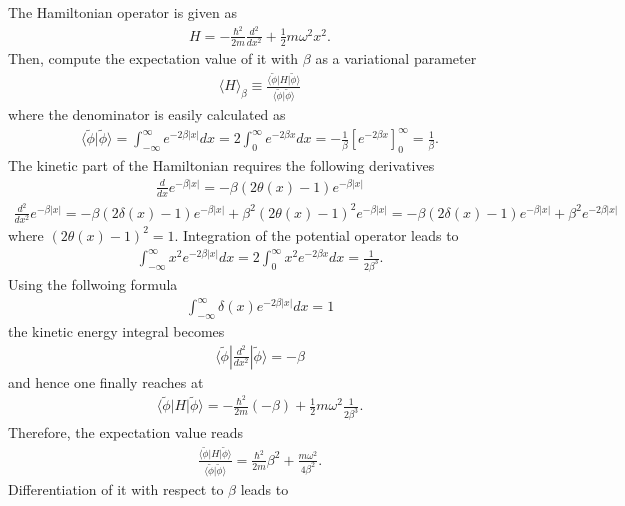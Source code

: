 \documentclass{jlreq}
\begin{document}
The Hamiltonian operator is given as
\begin{align}
    H=-\frac{\hbar^2}{2m}\frac{d^2}{dx^2}+\frac{1}{2}m\omega^2x^2.
\end{align}
Then, compute the expectation value of it with $\beta$ as a variational parameter
\begin{align}
    \langle H\rangle_\beta\equiv\frac{\langle\tilde{\phi}|H|\tilde{\phi}\rangle}{\langle\tilde{\phi}|\tilde{\phi}\rangle}
\end{align}
where the denominator is easily calculated as
\begin{align}
    \langle\tilde{\phi}|\tilde{\phi}\rangle=\int^\infty_{-\infty}e^{-2\beta|x|} dx=2\int^\infty_{0}e^{-2\beta x} dx = -\frac{1}{\beta}[e^{-2\beta x}]^\infty_0=\frac{1}{\beta}.
\end{align}
The kinetic part of the Hamiltonian requires the following derivatives
\begin{align}
    \frac{d}{dx}e^{-\beta |x|}=-\beta (2\theta(x)-1)e^{-\beta |x|}
\end{align}
\begin{align}
    \frac{d^2}{dx^2}e^{-\beta |x|}=-\beta (2\delta(x)-1)e^{-\beta |x|}+\beta^2 (2\theta(x)-1)^2 e^{-\beta |x|}=-\beta (2\delta(x)-1)e^{-\beta |x|}+\beta^2 e^{-2\beta |x|}
\end{align}
where $(2\theta(x)-1)^2=1$. Integration of the potential operator leads to
\begin{align}
    \int^\infty_{-\infty} x^2 e^{-2\beta|x|}dx=2\int^{\infty}_0 x^2 e^{-2\beta x}dx=\frac{1}{2\beta^3}.
\end{align}
Using the follwoing formula
\begin{align}
    \int^\infty_{-\infty} \delta(x) e^{-2\beta|x|}dx=1
\end{align}
the kinetic energy integral becomes
\begin{align}
    \langle\tilde{\phi}|\frac{d^2}{dx^2}|\tilde{\phi}\rangle=-\beta
\end{align}
and hence one finally reaches at
\begin{align}
    \langle\tilde{\phi}|H|\tilde{\phi}\rangle=-\frac{\hbar^2}{2m}(-\beta)+\frac{1}{2}m\omega^2\frac{1}{2\beta^3}.
\end{align}
Therefore, the expectation value reads
\begin{align}
    \frac{\langle\tilde{\phi}|H|\tilde{\phi}\rangle}{\langle\tilde{\phi}|\tilde{\phi}\rangle}=\frac{\hbar^2}{2m}\beta^2+\frac{m\omega^2}{4\beta^2}.
\end{align}
Differentiation of it with respect to $\beta$ leads to
\end{document}
